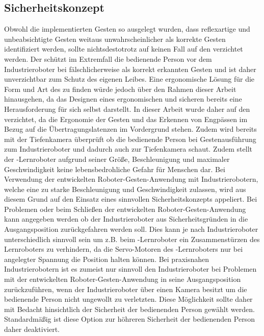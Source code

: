 \subsection{Sicherheitskonzept} %
Obwohl die implementierten Gesten so ausgelegt wurden, dass reflexartige und unbeabsichtigte Gesten weitaus unwahrscheinlicher als korrekte Gesten identifiziert werden, sollte nichtsdestotrotz auf keinen Fall auf den  verzichtet werden. Der  schützt im Extremfall die bedienende Person vor dem Industrieroboter bei fälschlicherweise als korrekt erkannten Gesten und ist daher unverzichtbar zum Schutz des eigenen Leibes. Eine ergonomische Lösung für die Form und Art des  zu finden würde jedoch über den Rahmen dieser Arbeit hinausgehen, da das Designen eines ergonomischen und sicheren  bereits eine Herausforderung für sich selbst darstellt. In dieser Arbeit wurde daher auf den  verzichtet, da die Ergonomie der Gesten und das Erkennen von Engpässen im Bezug auf die Übertragungslatenzen im Vordergrund stehen. Zudem wird bereits mit der Tiefenkamera überprüft ob die bedienende Person bei Gestenausführung zum Industrieroboter und dadurch auch zur Tiefenkamera schaut. Zudem stellt der -Lernroboter aufgrund seiner Größe, Beschleunigung und maximaler Geschwindigkeit keine lebensbedrohliche Gefahr für Menschen dar. Bei Verwendung der entwickelten Roboter-Gesten-Anwendung mit Industrierobotern, welche eine zu starke Beschleunigung und Geschwindigkeit zulassen, wird aus diesem Grund auf den Einsatz eines sinnvollen Sicherheitskonzepts appeliert. Bei Problemen oder beim Schließen der entwickelten Roboter-Gesten-Anwendung kann angegeben werden ob der Industrieroboter aus Sicherheitsgründen in die Ausgangsposition zurückgefahren werden soll. Dies kann je nach Industrieroboter unterschiedlich sinnvoll sein um z.B. beim -Lernroboter ein Zusammenstürzen des Lernroboters zu verhindern, da die Servo-Motoren des -Lernroboters nur bei angelegter Spannung die Position halten können. Bei praxisnahen Industrierobotern ist es zumeist nur sinnvoll den Industrieroboter bei Problemen mit der entwickelten Roboter-Gesten-Anwendung in seine Ausgangsposition zurückzuführen, wenn der Industrieroboter über einen Kamera besitzt um die bedienende Person nicht ungewollt zu verletzten. Diese Möglichkeit sollte daher mit Bedacht hinsichtlich der Sicherheit der bedienenden Person gewählt werden. Standardmäßig ist diese Option zur höhreren Sicherheit der bedienenden Person daher deaktiviert.

